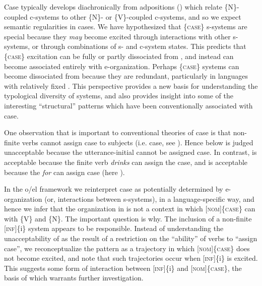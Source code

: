   Case typically develops diachronically from adpositions (\citealt{Heine2009,TraugottHeine1991}) which relate \{N\}-coupled c-systems to other \{N\}- or \{V\}-coupled c-systems, and so we expect semantic regularities in cases. We have hypothesized that \{\textsc{case}\} s-systems are special because they \textit{may} become excited through interactions with other s-systems, or through combinations of s- and c-system states. This predicts that \{\textsc{case}\} excitation can be fully or partly dissociated from , and instead can become associated entirely with e-organization. Perhaps \{\textsc{case}\} systems can become dissociated from  because they are redundant, particularly in languages with relatively fixed . This perspective provides a new basis for understanding the typological diversity of  systems, and also provides insight into some of the interesting “structural” patterns which have been conventionally associated with case. 

  One observation that is important to conventional theories of case is that non-finite verbs cannot assign case to subjects (i.e.  case, see \citealt{Chomsky1980,ChomskyLasnik1977,Vergnaud2006}). Hence  below is judged unacceptable because the utterance-initial  cannot be assigned case. In contrast,  is acceptable because the finite verb \textit{drinks} can assign the  case, and  is acceptable because the  \textit{for} can assign case (here ).

\ea\label{ex:4:1}


\z
\z

  In the o/el framework we reinterpret case as potentially determined by e-organization (or, interactions between s-systems), in a language-specific way, and hence we infer that the organization in  is not a context in which [\textsc{nom}]\{\textsc{case}\} can  with \{V\} and \{N\}. The important question is why. The inclusion of a non-finite [\textsc{inf}]\{i\} system appears to be responsible. Instead of understanding the unacceptability of  as the result of a restriction on the “ability” of verbs to “assign case”, we reconceptualize the pattern as a trajectory in which [\textsc{nom}]\{\textsc{case}\} does not become excited, and note that such trajectories occur when [\textsc{inf}]\{i\} is excited. This suggests some form of interaction between [\textsc{inf}]\{i\} and [\textsc{nom}]\{\textsc{case}\}, the basis of which warrants further investigation.


